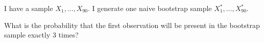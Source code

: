 
\begin{question}
I have a sample \(X_1, \ldots, X_{90}\).
I generate one naive bootstrap sample \(X^*_1, \ldots, X^*_{90}\).



What is the probability that the first observation will be present in the bootstrap sample exactly 3 times?






\end{question}


